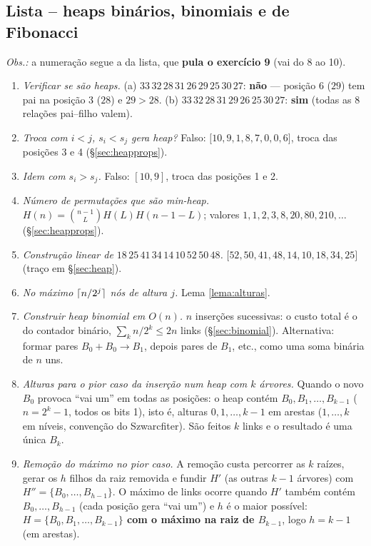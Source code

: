 \subsection{Lista -- heaps binários, binomiais e de Fibonacci}
\emph{Obs.:} a numeração segue a da lista, que \textbf{pula o exercício 9} (vai do 8 ao 10).
\begin{enumerate}
  \item \emph{Verificar se são heaps.} (a) $33\,32\,28\,31\,26\,29\,25\,30\,27$: \textbf{não} --- posição 6 ($29$) tem pai na posição 3 ($28$) e $29>28$. (b) $33\,32\,28\,31\,29\,26\,25\,30\,27$: \textbf{sim} (todas as 8 relações pai--filho valem).
  \item \emph{Troca com $i<j$, $s_i<s_j$ gera heap?} Falso: $[10,9,1,8,$\allowbreak$7,0,0,6]$, troca das posições 3 e 4 (§\ref{sec:heapprops}).
  \item \emph{Idem com $s_i>s_j$.} Falso: $[10,9]$, troca das posições 1 e 2.
  \item \emph{Número de permutações que são min-heap.} $H(n)=\binom{n-1}{L}H(L)H(n-1-L)$; valores $1,1,2,3,8,$\allowbreak$20,80,210,\dots$ (§\ref{sec:heapprops}).
  \item \emph{Construção linear de $18\,25\,41\,34\,14\,10\,52\,50\,48$.} $[52,50,41,48,$\allowbreak$14,10,18,34,25]$ (traço em §\ref{sec:heap}).
  \item \emph{No máximo $\lceil n/2^j\rceil$ nós de altura $j$.} Lema \ref{lema:alturas}.
  \item \emph{Construir heap binomial em $O(n)$.} $n$ inserções sucessivas: o custo total é o do contador binário, $\sum_k n/2^k\le2n$ links (§\ref{sec:binomial}). Alternativa: formar pares $B_0+B_0\to B_1$, depois pares de $B_1$, etc., como uma soma binária de $n$ uns.
  \item \emph{Alturas para o pior caso da inserção num heap com $k$ árvores.} Quando o novo $B_0$ provoca ``vai um'' em todas as posições: o heap contém \textbf{$B_0,B_1,\dots,B_{k-1}$} ($n=2^k-1$, todos os bits 1), isto é, alturas $0,1,\dots,k-1$ em arestas ($1,\dots,k$ em níveis, convenção do Szwarcfiter). São feitos $k$ links e o resultado é uma única $B_k$.
  \item[10.] \emph{Remoção do máximo no pior caso.} A remoção custa percorrer as $k$ raízes, gerar os $h$ filhos da raiz removida e fundir $H'$ (as outras $k-1$ árvores) com $H''=\{B_0,\dots,B_{h-1}\}$. O máximo de links ocorre quando $H'$ também contém $B_0,\dots,B_{h-1}$ (cada posição gera ``vai um'') e $h$ é o maior possível: \textbf{$H=\{B_0,B_1,\dots,B_{k-1}\}$ com o máximo na raiz de $B_{k-1}$}, logo $h=k-1$ (em arestas).

\end{enumerate}
